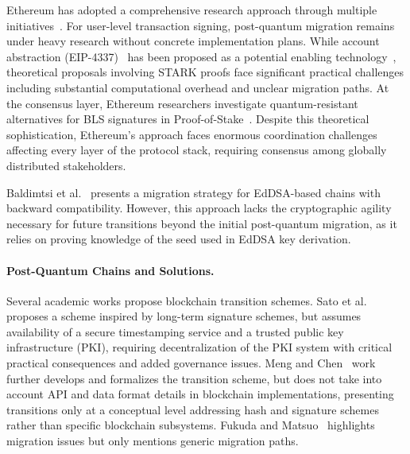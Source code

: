 Ethereum has adopted a comprehensive research approach through multiple initiatives~\cite{ref_ethereum_pse,ref_ethereum_transition}. For user-level transaction signing, post-quantum migration remains under heavy research without concrete implementation plans. While account abstraction (EIP-4337)~\cite{ref_ethereum_aa} has been proposed as a potential enabling technology~\cite{ref_ethereum_pqc}, theoretical proposals involving STARK proofs face significant practical challenges including substantial computational overhead and unclear migration paths. At the consensus layer, Ethereum researchers investigate quantum-resistant alternatives for BLS signatures in Proof-of-Stake~\cite{ref_drake_pqbls}. Despite this theoretical sophistication, Ethereum's approach faces enormous coordination challenges affecting every layer of the protocol stack, requiring consensus among globally distributed stakeholders.

Baldimtsi et al.~\cite{EPRINT:BCR25} presents a migration strategy for EdDSA-based chains with backward compatibility. 
However, this approach lacks the cryptographic agility necessary for future transitions beyond the initial post-quantum migration, as it relies on proving knowledge of the seed used in EdDSA key derivation.

\paragraph{Post-Quantum Chains and Solutions.} Several academic works propose blockchain transition schemes. Sato et al.~\cite{ICCCN:SM17} proposes a scheme inspired by long-term signature schemes, but assumes availability of a secure timestamping service and a trusted public key infrastructure (PKI), requiring decentralization of the PKI system with critical practical consequences and added governance issues. 
Meng and Chen~\cite{ESORICS:MenChe22} work further develops and formalizes the transition scheme, but does not take into account API and data format details in blockchain implementations, presenting transitions only at a conceptual level addressing hash and signature schemes rather than specific blockchain subsystems. 
Fukuda and Matsuo~\cite{EPRINT:FM25} highlights migration issues but only mentions generic migration paths.

